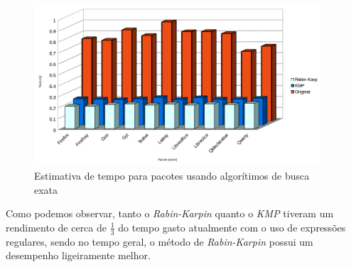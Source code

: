 \begin{figure}[htbp]
  \centering
  \includegraphics[width=0.95\textwidth]{figuras/tempo-rk_kmp_std}
  \caption{Estimativa de tempo para pacotes usando algorítimos de busca exata}
  \label{tempo_rk_kmp_std}
\end{figure}

Como podemos observar, tanto o \textit{Rabin-Karpin} quanto o \textit{KMP} tiveram um rendimento de cerca de $\frac{1}{3}$ do tempo gasto atualmente com o uso de expressões regulares, sendo no tempo geral, o método de \textit{Rabin-Karpin} possui um desempenho ligeiramente melhor.

